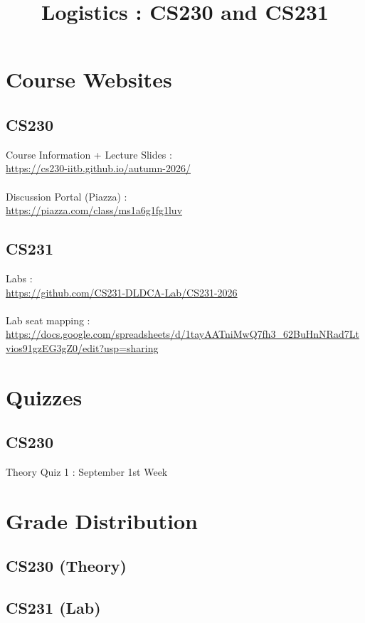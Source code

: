 \documentclass{article}
\title{Logistics : CS230 and CS231}
\date{}
\begin{document}
\maketitle

\section{Course Websites}
\subsection{CS230}
Course Information + Lecture Slides : \\\url{https://cs230-iitb.github.io/autumn-2026/}\\\\
Discussion Portal (Piazza) : \\\url{https://piazza.com/class/ms1a6g1fg1luv}
\subsection{CS231}
Labs : \\
\url{https://github.com/CS231-DLDCA-Lab/CS231-2026}
\\\\
Lab seat mapping : \\\url{https://docs.google.com/spreadsheets/d/1tayAATniMwQ7fh3_62BuHnNRad7Ltvios91gzEG3gZ0/edit?usp=sharing}
\section{Quizzes}

        \subsection{CS230}
        Theory Quiz 1 : September 1st Week
\newpage
\section{Grade Distribution}
\subsection{CS230 (Theory)}
\subsection{CS231 (Lab)}
\end{document}
